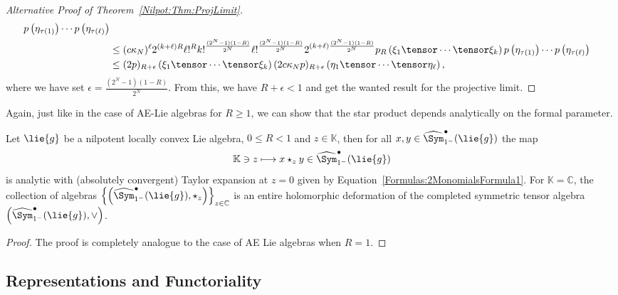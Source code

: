 \begin{proof}[Alternative Proof of Theorem~\ref{Nilpot:Thm:ProjLimit}]
\begin{align*}
		p\left( \eta_{\tau(1)} \right)
		\cdots
		p\left( \eta_{\tau(\ell)} \right)
		\\
		& \leq
		(c \kappa_N)^{\ell}
		2^{(k + \ell) R}
		\ell!^R
		k!^{\frac{(2^N - 1) (1-R)}{2^N} }
		\ell!^{\frac{(2^N - 1) (1-R)}{2^N} }
		2^{ (k + \ell) \frac{(2^N - 1) (1-R)}{2^N} }
		p_R \left( \xi_1 \tensor \cdots \tensor \xi_k \right)
		p\left( \eta_{\tau(1)} \right)
		\cdots
		p\left( \eta_{\tau(\ell)} \right)
		\\
		& \leq
		(2 p)_{R + \epsilon} 
		\left( \xi_1 \tensor \cdots \tensor \xi_k  \right)
		(2 c \kappa_N p)_{R + \epsilon} 
		\left( \eta_1 \tensor \cdots \tensor \eta_\ell \right),
	\end{align*}
	where we have set $\epsilon = \frac{(2^N - 1)(1 - R)}{2^N}$. From this,
	we have $R + \epsilon < 1$ and get the wanted result for the 
	projective limit.
\end{proof}
Again, just like in the case of AE-Lie algebras for $R \geq 1$, we can show that 
the star product depends analytically on the formal parameter.
\begin{proposition}[Dependence on $z$]
    \label{Nilpot:corollary:HolomorphicDependence}%
    Let $\lie{g}$ be a nilpotent locally convex Lie algebra, $0 \leq R < 1$ and $z 
    \in \mathbb{K}$, then for all $x, y \in \widehat{\Sym}_{1^-}^\bullet(\lie{g})$ 
    the map
    \begin{equation}
        \label{Nilpot:Holomorphicity}
        \mathbb{K} \ni z
        \longmapsto
        x \star_z y \in
        \widehat{\Sym}_{1^-}^\bullet(\lie{g})
    \end{equation}
    is analytic with (absolutely convergent) Taylor expansion at $z = 0$ 
    given by Equation~\eqref{Formulas:2MonomialsFormula1}. For 
    $\mathbb{K} = \mathbb{C}$, the collection of algebras $\left\{ \left( 
    \widehat{\Sym}_{1^-}^\bullet(\lie{g}), \star_z \right) \right\}_{z \in 
    \mathbb{C}}$ is an entire holomorphic deformation of the completed 
    symmetric tensor algebra $\left( \widehat{\Sym}_{1^-}^\bullet(\lie{g}), \vee 
    \right)$.
\end{proposition}
\begin{proof}
	The proof is completely analogue to the case of AE Lie algebras when $R = 1$.
\end{proof}


%
%

\subsection{Representations and Functoriality}
\label{subsec:NilpotentFunctorialityRepresentations}

